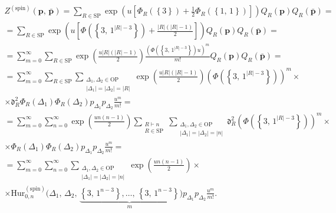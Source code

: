 \documentclass[a4paper,14pt]{extarticle}
\numberwithin{equation}{section}
\begin{document}
\begin{multline*}
	Z^{\mathrm{(spin)}}\left( \mathbf{p},\,\bar{\mathbf{p}} \right) =
	\sum_{R \in \mathrm{SP}}^{} \exp \left( {u \left[ \Phi_R \left( \left\{ 3 \right\}  \right) +\frac{1}{2}\Phi_R \left( \left\{ 1,\,1 \right\}  \right)  \right] } \right) Q_{R}(\mathbf{p})Q_R\left(\bar{\mathbf{p}} \right) =\\=
	\sum_{R \in \mathrm{SP}}^{} 
	\exp \left( u \left[ 
	\Phi\left( \left\{ 3,\,1^{|R|-3} \right\} \right) +\frac{|R|\left( |R|-1 \right)}{2} \right]  \right) Q_R\left( \mathbf{p} \right) Q_R\left(\bar{\mathbf{p}}\right)=\\=
\sum_{m=0}^{\infty} \sum_{R \in \mathrm{SP}}^{} 
\exp \left(\frac{u|R|\left( |R|-1 \right) }{2}\right)
\frac{\left(\Phi\left( \left\{ 3,\,1^{|R|-3} \right\} \right)u \right)^m}{m!}   Q_R\left( \mathbf{p} \right) Q_R\left(\bar{\mathbf{p}}\right)=\\=\sum_{m=0}^{\infty} \sum_{R \in \mathrm{SP}}^{} \sum_{\substack{\Delta_1,\Delta_2 \in \mathrm{OP}\\ |\Delta_1|=|\Delta_2|=|R|}}^{} 
\exp \left(\frac{u|R|\left( |R|-1 \right) }{2}\right)
\left(\Phi\left( \left\{ 3,\,1^{|R|-3} \right\} \right) \right)^m   \times \\ \times \mathfrak{d}_R^2 \Phi_R\left( \Delta_1 \right) \Phi_R\left(\Delta_2\right)p_{\Delta_1}p_{\Delta_2}  \frac{u^m}{m!}=\\=\sum_{m=0}^{\infty}\sum_{n=0}^{\infty} 
\exp \left( \frac{un(n-1)}{2} \right) 
\sum_{\substack{R \vdash n\\R \in \mathrm{SP}}}^{} \sum_{\substack{\Delta_1,\Delta_2 \in \mathrm{OP}\\ |\Delta_1|=|\Delta_2|=|n|}}^{} \mathfrak{d}_R^2
\left(\Phi\left( \left\{ 3,\,1^{|R|-3} \right\} \right) \right)^m   \times \\ \times  \Phi_R\left( \Delta_1 \right) \Phi_R\left(\Delta_2\right)p_{\Delta_1}p_{\Delta_2}  \frac{u^m}{m!}=\\=\sum_{m=0}^{\infty}\sum_{n=0}^{\infty}\sum_{\substack{\Delta_1,\Delta_2 \in \mathrm{OP}\\ |\Delta_1|=|\Delta_2|=|n|}}^{} 
\exp \left( \frac{un(n-1)}{2} \right) \times\\\times
\mathrm{Hur}_{0,n}^{\mathrm{(spin)}}\bigl( \Delta_1,\,\Delta_2,\,\underbrace{\left\{ 3,\,1^{n-3} \right\}, \ldots,\,\left\{ 3,\,1^{n-3} \right\}}_{m}  \bigr)  p_{\Delta_1}p_{\Delta_2}  \frac{u^m}{m!}
.\end{multline*} 
\end{document}
